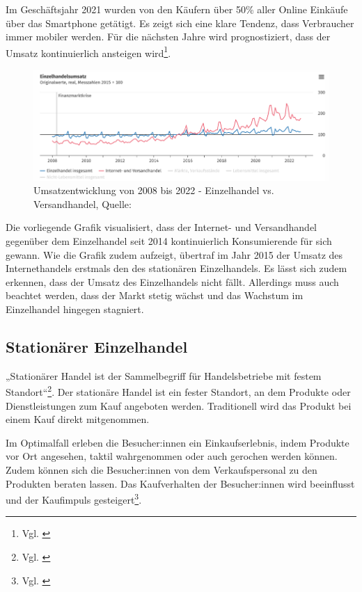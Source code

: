 Im Geschäftsjahr 2021 wurden von den Käufern über 50\% aller Online Einkäufe über das Smartphone getätigt. Es zeigt sich eine klare Tendenz, dass Verbraucher immer mobiler werden. Für die nächsten Jahre wird prognostiziert, dass der Umsatz kontinuierlich ansteigen wird\footnote{Vgl. \autocite [Online] {Handelsverband2022}}.

\begin{figure}[!ht]
    \centering
    \includegraphics[width=1\textwidth,angle=0]{src/abbildungen/onlineVsEinzelhandel.png}
    \caption[Quelle: Statistisches Bundesamt, 2022]{Umsatzentwicklung von 2008 bis 2022 - Einzelhandel vs. Versandhandel, Quelle: \autocite {Bundesamt2022}}
   \label{fig: Statistisches_Bundesamt}
   \end{figure}

Die vorliegende Grafik visualisiert, dass der Internet- und Versandhandel gegenüber dem Einzelhandel seit 2014 kontinuierlich Konsumierende für sich gewann. Wie die Grafik zudem aufzeigt, übertraf im Jahr 2015 der Umsatz des Internethandels erstmals den des stationären Einzelhandels. Es lässt sich zudem erkennen, dass der Umsatz des Einzelhandels nicht fällt. Allerdings muss auch beachtet werden, dass der Markt stetig wächst und das Wachstum im Einzelhandel hingegen stagniert.


\subsection{Stationärer Einzelhandel}\label{unterabschnitt_2_3}
„Stationärer Handel ist der Sammelbegriff für Handelsbetriebe mit festem Standort“\footnote{Vgl. \autocite [S.23] {Heinemann2011}}.
\newline
Der stationäre Handel ist ein fester Standort, an dem Produkte oder Dienstleistungen zum Kauf angeboten werden. Traditionell wird das Produkt bei einem Kauf direkt mitgenommen.
\newline

Im Optimalfall erleben die Besucher:innen ein Einkaufserlebnis, indem Produkte vor Ort angesehen, taktil wahrgenommen oder auch gerochen werden können. Zudem können sich die Besucher:innen von dem Verkaufspersonal zu den Produkten beraten lassen. Das Kaufverhalten der Besucher:innen wird beeinflusst und der Kaufimpuls gesteigert\footnote{ Vgl. \autocite [S.71] {Buttkus2019}}.
\newline

